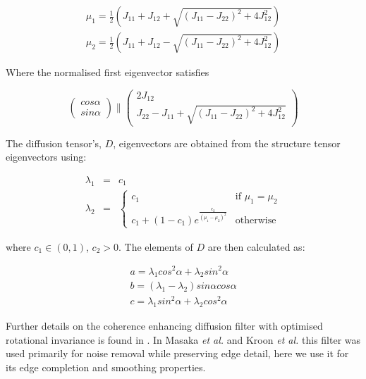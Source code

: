 \begin{eqnarray}
\mu_{1} = \frac{1}{2}\left( J_{11} + J_{12} + \sqrt{(J_{11}-J_{22})^2+4J_{12}^2} \right) \\
\mu_{2} = \frac{1}{2}\left( J_{11} + J_{12} - \sqrt{(J_{11}-J_{22})^2+4J_{12}^2} \right)
\end{eqnarray}

Where the normalised first eigenvector satisfies

\begin{equation}
\begin{pmatrix}
cos \alpha \\
sin \alpha
\end{pmatrix} \parallel
\begin{pmatrix}
2J_{12} \\
J_{22}-J_{11}+\sqrt{(J_{11}-J_{22})^2 + 4J_{12}^2}
\end{pmatrix}
\end{equation}

The diffusion tensor's, $D$, eigenvectors are obtained from the structure tensor eigenvectors using:

\begin{eqnarray}
\lambda_1 &=& c_1 \\
\lambda_2 &=& \left\lbrace \begin{matrix}
c_1 & \text{if } \mu_1=\mu_2 \\
c_1+(1-c_1)e^{\frac{c_2}{(\mu_1-\mu_2)^2}}& \text{otherwise}
\end{matrix}
\right.
\end{eqnarray}

where $c_1 \in (0,1)$, $c_2>0$. The elements of $D$ are then calculated as:

\begin{eqnarray}
a = \lambda_1 cos^2 \alpha + \lambda_2 sin^2 \alpha \\
b = (\lambda_1 - \lambda_2)sin \alpha cos \alpha \\
c = \lambda_1 sin^2 \alpha + \lambda_2 cos^2 \alpha
\end{eqnarray}

Further details on the coherence enhancing diffusion filter with optimised rotational invariance is found in \cite{Weickert2002}. In Masaka \textit{et al.} \citep{Maska2013} and Kroon \textit{et al.} \citep{Kroon2009} this filter was used primarily for noise removal while preserving edge detail, here we use it for its edge completion and smoothing properties.

